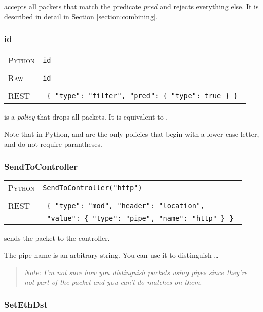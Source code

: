  accepts all packets that match the predicate $pred$ and rejects everything else.
It is described in detail in Section \ref{section:combining}.

\subsubsection{id}

\bigskip
\begin{tabularx}{\linewidth}{lX}
\textsc{Python}   & \texttt{id} \\ \\
\textsc{Raw}   & \texttt{id} \\ \\
\textsc{REST} & \texttt{ \{ "type": "filter", "pred": \{ "type": true \} \} } 
\end{tabularx}

 is a \emph{policy} that drops all packets.  It is equivalent to .

Note that in Python,  and  are the only policies that begin with a lower case
letter, and do not require parantheses.  

\subsubsection{SendToController}

\bigskip
\begin{tabularx}{\linewidth}{lX}
\textsc{Python}   & \texttt{SendToController("http")} \\ \\
\textsc{REST} & \texttt{ \{ "type": "mod", "header": "location", } \\
 & \texttt{ "value": \{ "type": "pipe", "name": "http" \} \} } 
\end{tabularx}

 sends the packet to the controller.   

The pipe name is an arbitrary string.  You can use it to distinguish \ldots

\begin{quotation}
\emph{Note: I'm not sure how you distinguish packets using pipes since they're not part of the 
packet and you can't do matches on them.}
\end{quotation}

\subsubsection{SetEthDst}

